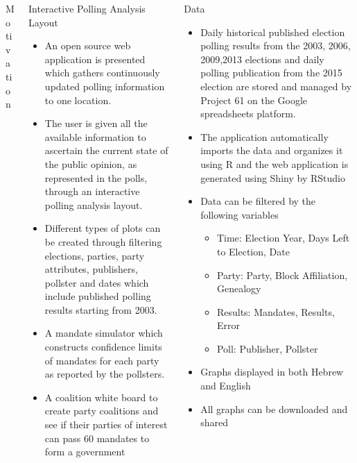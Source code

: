 \documentclass[final, hyperref={pdfpagelabels=false}]{beamer}
\begin{document}
\begin{frame}{}
\begin{columns}[t]
\begin{column}{.3\linewidth}
\begin{block}{Motivation}
\begin{itemize}
				\end{itemize}
			\end{block}
		\end{column}
		\begin{column}{.3\linewidth}			
			\begin{block}{Interactive Polling Analysis Layout} 
				 \begin{itemize}
					 \item An open source web application is presented which gathers continuously updated polling information to one location. 
					 \item The user is given all the available information to ascertain the current state of the public opinion, as represented in the polls, through an interactive polling analysis layout.
				 	\item Different types of plots can be created through filtering elections, parties, party attributes, publishers, pollster and dates which include published polling results starting from 2003.
				 	\item  A mandate simulator which constructs confidence limits of mandates for each party as reported by the pollsters.
				 	\item A coalition white board to create party coalitions and see if their parties of interest can pass 60 mandates to form a government
				 \end{itemize} 
			\end{block}
		\end{column}
		\begin{column}{.3\linewidth}
			\begin{block}{Data}
			\begin{itemize}
			\item Daily historical published election polling results from the 2003, 2006, 2009,2013 elections and daily polling publication from the 2015 election are stored and managed by Project 61 on the Google spreadsheets platform.
			\item The application automatically imports the data and organizes it using R and the web application is generated using Shiny by RStudio 
			\item Data can be filtered by the following variables
			\begin{itemize}
			\item Time: Election Year, Days Left to Election, Date
			\item Party: Party, Block Affiliation, Genealogy
			\item Results: Mandates, Results, Error
			\item Poll: Publisher, Pollster
			\end{itemize}
			\item Graphs displayed in both Hebrew and English
			\item All graphs can be downloaded and shared
			\end{itemize}
			 

\end{block}
\end{column}
\end{columns}
\end{frame}
\end{document}

